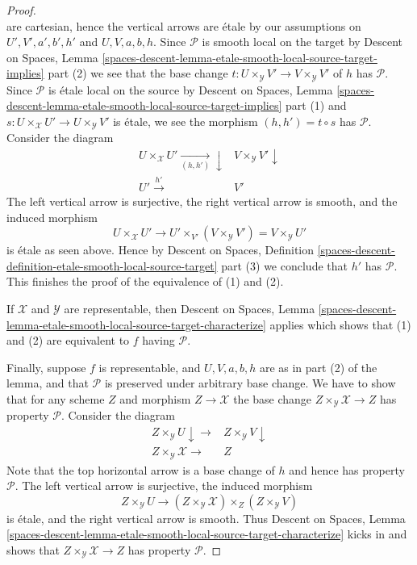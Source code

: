 \begin{proof}
$$$$
are cartesian, hence the vertical arrows are \'etale by our assumptions on
$U', V', a', b', h'$ and $U, V, a, b, h$.
Since $\mathcal{P}$ is smooth local on the target by
Descent on Spaces, Lemma
\ref{spaces-descent-lemma-etale-smooth-local-source-target-implies} part (2)
we see that the base change
$t : U \times_\mathcal{Y} V' \to V \times_\mathcal{Y} V'$ of $h$
has $\mathcal{P}$. Since $\mathcal{P}$ is \'etale local on the source by
Descent on Spaces, Lemma
\ref{spaces-descent-lemma-etale-smooth-local-source-target-implies} part (1)
and $s : U \times_\mathcal{X} U' \to U \times_\mathcal{Y} V'$ is \'etale,
we see the morphism $(h, h') = t \circ s$ has $\mathcal{P}$.
Consider the diagram
$$
\begin{array}{cc}U \times_\mathcal{X} U' \underset{(h, h')}{\longrightarrow}\downarrow & V \times_\mathcal{Y} V' \downarrow \\ U' \overset{h'}{\longrightarrow} & V'\end{array}
$$
The left vertical arrow is surjective, the right vertical arrow is smooth, and
the induced morphism
$$
U \times_\mathcal{X} U'
\longrightarrow
U' \times_{V'} (V \times_\mathcal{Y} V') = V \times_\mathcal{Y} U'
$$
is \'etale as seen above. Hence by
Descent on Spaces, Definition
\ref{spaces-descent-definition-etale-smooth-local-source-target} part (3)
we conclude that $h'$ has $\mathcal{P}$. This finishes the proof of the
equivalence of (1) and (2).

\medskip\noindent
If $\mathcal{X}$ and $\mathcal{Y}$ are representable, then
Descent on Spaces,
Lemma \ref{spaces-descent-lemma-etale-smooth-local-source-target-characterize}
applies which shows that (1) and (2) are equivalent to $f$ having
$\mathcal{P}$.

\medskip\noindent
Finally, suppose $f$ is representable, and $U, V, a, b, h$ are
as in part (2) of the lemma, and that $\mathcal{P}$ is preserved under
arbitrary base change. We have to show that for any scheme
$Z$ and morphism $Z \to \mathcal{X}$ the base change
$Z \times_\mathcal{Y} \mathcal{X} \to Z$
has property $\mathcal{P}$. Consider the diagram
$$
\begin{array}{cc}Z \times_\mathcal{Y} U \downarrow\longrightarrow & Z \times_\mathcal{Y} V \downarrow \\ Z \times_\mathcal{Y} \mathcal{X} \longrightarrow & Z\end{array}
$$
Note that the top horizontal arrow is a base change of $h$ and
hence has property $\mathcal{P}$. The left vertical arrow is
surjective, the induced morphism
$$
Z \times_\mathcal{Y} U \longrightarrow
(Z \times_\mathcal{Y} \mathcal{X}) \times_Z (Z \times_\mathcal{Y} V)
$$
is \'etale, and the right vertical arrow is smooth. Thus
Descent on Spaces,
Lemma \ref{spaces-descent-lemma-etale-smooth-local-source-target-characterize}
kicks in and shows that $Z \times_\mathcal{Y} \mathcal{X} \to Z$
has property $\mathcal{P}$.
\end{proof}

